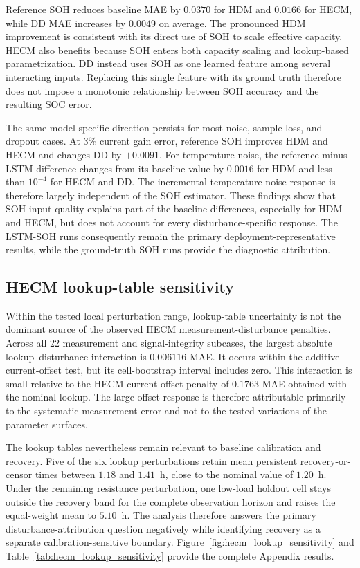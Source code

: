\documentclass[review,nopreprintline]{elsarticle}
\begin{document}
Reference SOH reduces baseline MAE by $0.0370$ for HDM and $0.0166$ for HECM, while DD MAE increases by $0.0049$ on average. The pronounced HDM improvement is consistent with its direct use of SOH to scale effective capacity. HECM also benefits because SOH enters both capacity scaling and lookup-based parametrization. DD instead uses SOH as one learned feature among several interacting inputs. Replacing this single feature with its ground truth therefore does not impose a monotonic relationship between SOH accuracy and the resulting SOC error.

The same model-specific direction persists for most noise, sample-loss, and dropout cases. At $3\%$ current gain error, reference SOH improves HDM and HECM and changes DD by $+0.0091$. For temperature noise, the reference-minus-LSTM difference changes from its baseline value by $0.0016$ for HDM and less than $10^{-4}$ for HECM and DD. The incremental temperature-noise response is therefore largely independent of the SOH estimator. These findings show that SOH-input quality explains part of the baseline differences, especially for HDM and HECM, but does not account for every disturbance-specific response. The LSTM-SOH runs consequently remain the primary deployment-representative results, while the ground-truth SOH runs provide the diagnostic attribution.

\subsection{HECM lookup-table sensitivity}
Within the tested local perturbation range, lookup-table uncertainty is not the dominant source of the observed HECM measurement-disturbance penalties. Across all 22 measurement and signal-integrity subcases, the largest absolute lookup--disturbance interaction is $0.006116$ MAE. It occurs within the additive current-offset test, but its cell-bootstrap interval includes zero. This interaction is small relative to the HECM current-offset penalty of $0.1763$ MAE obtained with the nominal lookup. The large offset response is therefore attributable primarily to the systematic measurement error and not to the tested variations of the parameter surfaces.

The lookup tables nevertheless remain relevant to baseline calibration and recovery. Five of the six lookup perturbations retain mean persistent recovery-or-censor times between $1.18$ and $1.41$~h, close to the nominal value of $1.20$~h. Under the remaining resistance perturbation, one low-load holdout cell stays outside the recovery band for the complete observation horizon and raises the equal-weight mean to $5.10$~h. The analysis therefore answers the primary disturbance-attribution question negatively while identifying recovery as a separate calibration-sensitive boundary. Figure~\ref{fig:hecm_lookup_sensitivity} and Table~\ref{tab:hecm_lookup_sensitivity} provide the complete Appendix results.
\end{document}
